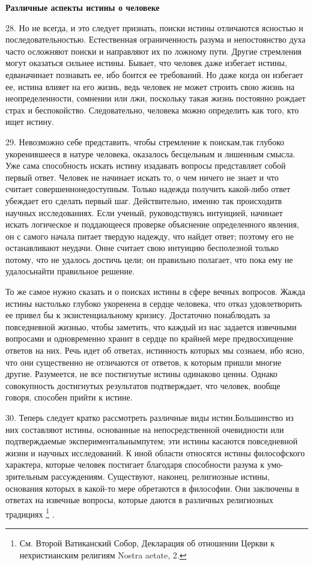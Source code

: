 \documentclass[a5paper,10pt]{article}
\begin{document}
\textbf{Различные аспекты истины о человеке}

28. Но не всегда, и это следует признать, поиски истины отличаются ясностью и
последовательностью. Естественная ограниченность разума и непостоянство духа
часто осложняют поиски и направляют их по ложному пути. Другие стремления могут
оказаться сильнее истины. Бывает, что человек даже избегает истины,
едваначинает познавать ее, ибо боится ее требований. Но даже когда он избегает
ее, истина влияет на его жизнь, ведь человек не может строить свою жизнь на
неопределенности, сомнении или лжи, поскольку такая жизнь постоянно рождает
страх и беспокойство. Следовательно, человека можно определить как того, кто
ищет истину.

29. Невозможно себе представить, чтобы стремление к поискам,так глубоко
укоренившееся в натуре человека, оказалось бесцельным и лишенным смысла. Уже
сама способность искать истину изадавать вопросы представляет собой первый
ответ. Человек не начинает искать то, о чем ничего не знает и что считает
совершеннонедоступным. Только надежда получить какой-либо ответ убеждает его
сделать первый шаг. Действительно, именно так происходитв научных
исследованиях. Если ученый, руководствуясь интуицией, начинает искать
логическое и поддающееся проверке объяснение определенного явления, он с самого
начала питает твердую надежду, что найдет ответ; поэтому его не останавливают
неудачи. Онне считает свою интуицию бесполезной только потому, что не удалось
достичь цели; он правильно полагает, что пока ему не удалосьнайти правильное
решение.

То же самое нужно сказать и о поисках истины в сфере вечных вопросов. Жажда
истины настолько глубоко укоренена в сердце человека, что отказ удовлетворить
ее привел бы к экзистенциальному кризису. Достаточно понаблюдать за
повседневной жизнью, чтобы заметить, что каждый из нас задается извечными
вопросами и одновременно хранит в сердце по крайней мере предвосхищение ответов
на них. Речь идет об ответах, истинность которых мы сознаем, ибо ясно, что они
существенно не отличаются от ответов, к которым пришли многие другие.
Разумеется, не все постигнутые истины одинаково ценны. Однако совокупность
достигнутых результатов подтверждает, что человек, вообще говоря, способен
прийти к истине.

30. Теперь следует кратко рассмотреть различные виды истин.Большинство из них
составляют истины, основанные на непосредственной очевидности или
подтверждаемые экспериментальнымпутем; эти истины касаются повседневной жизни и
научных исследований. К иной области относятся истины философского характера,
которые человек постигает благодаря способности разума к умо-зрительным
рассуждениям. Существуют, наконец, религиозные истины, основания которых в
какой-то мере обретаются в философии. Они заключены в ответах на извечные
вопросы, которые даются в различных религиозных традициях \footnote{См. Второй
Ватиканский Собор, Декларация об отношении Церкви к нехристианским религиям
Nostra aetate, 2.}  .
\end{document}
